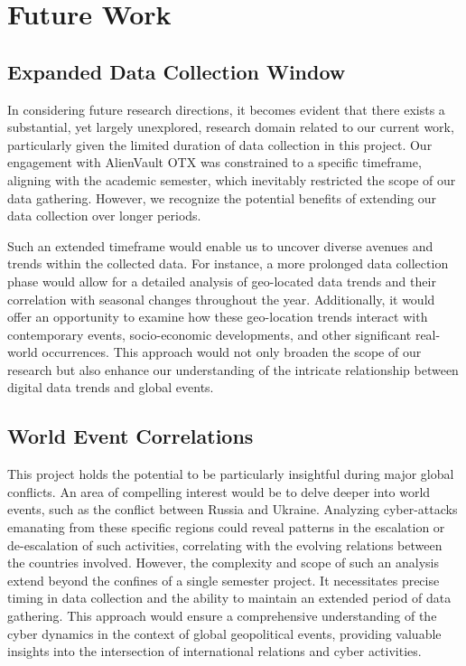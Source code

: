 \documentclass[letterpaper, 10 pt, conference]{ieeeconf}  %
\begin{document}
\section{Future Work}
\subsection*{Expanded Data Collection Window}
In considering future research directions, it becomes evident that there exists a substantial, yet largely unexplored, research domain related to our current work, particularly given the limited duration of data collection in this project. Our engagement with AlienVault OTX was constrained to a specific timeframe, aligning with the academic semester, which inevitably restricted the scope of our data gathering. However, we recognize the potential benefits of extending our data collection over longer periods.

Such an extended timeframe would enable us to uncover diverse avenues and trends within the collected data. For instance, a more prolonged data collection phase would allow for a detailed analysis of geo-located data trends and their correlation with seasonal changes throughout the year. Additionally, it would offer an opportunity to examine how these geo-location trends interact with contemporary events, socio-economic developments, and other significant real-world occurrences. This approach would not only broaden the scope of our research but also enhance our understanding of the intricate relationship between digital data trends and global events.

\subsection*{World Event Correlations}
This project holds the potential to be particularly insightful during major global conflicts. An area of compelling interest would be to delve deeper into world events, such as the conflict between Russia and Ukraine. Analyzing cyber-attacks emanating from these specific regions could reveal patterns in the escalation or de-escalation of such activities, correlating with the evolving relations between the countries involved.
However, the complexity and scope of such an analysis extend beyond the confines of a single semester project. It necessitates precise timing in data collection and the ability to maintain an extended period of data gathering. This approach would ensure a comprehensive understanding of the cyber dynamics in the context of global geopolitical events, providing valuable insights into the intersection of international relations and cyber activities.
\end{document}
